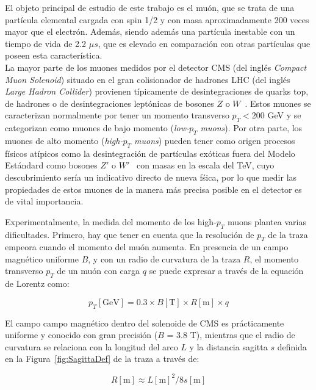
El objeto principal de estudio de este trabajo es el mu\'on, que se trata de una part\'icula elemental cargada con spin 1/2 y con masa aproximadamente 200 veces mayor que el electr\'on. Adem\'as, siendo adem\'as una part\'icula inestable con un tiempo de vida de 2.2 $\mu s$, que es elevado en comparaci\'on con otras part\'iculas que poseen esta caracter\'istica. \\

La mayor parte de los muones medidos por el detector CMS (del ingl\'es \textit{Compact Muon Solenoid}) situado en el gran colisionador de hadrones LHC (del ingl\'es \textit{Large Hadron Collider}) provienen t\'ipicamente de desintegraciones de quarks top, de hadrones o de desintegraciones lept\'onicas de bosones $Z$ o $W$~\cite{PhysRevD.98.030001}. Estos muones se caracterizan normalmente por tener un momento transverso $p_{T} < 200$ GeV y se categorizan como muones de bajo momento (\textit{low-$p_{T}$ muons}). Por otra parte, los muones de alto momento (\textit{high-$p_{T}$ muons}) pueden tener como origen procesos f\'isicos at\'ipicos como la desintegraci\'on de part\'iculas ex\'oticas fuera del Modelo Est\'andard como bosones $Z'$ o $W'$~\cite{CMS-PAS-EXO-19-019,2017278} con masas en la escala del TeV, cuyo descubrimiento ser\'ia un indicativo directo de nueva f\'sica, por lo que medir las propiedades de estos muones de la manera m\'as precisa posible en el detector es de vital importancia.

Experimentalmente, la medida del momento de los high-$p_{T}$ muons plantea varias dificultades. Primero, hay que tener en cuenta que la resoluci\'on de $p_{T}$ de la traza empeora cuando el momento del mu\'on aumenta.
En presencia de un campo magn\'etico uniforme $B$, y con un radio de curvatura de la traza $R$, el momento transverso $p_{T}$ de un mu\'on con carga $q$ se puede expresar a trav\'es de la equaci\'on de Lorentz como:

\begin{equation}
  p_{T}[\text{GeV}] = 0.3 \times B[\text{T}] \times R[\text{m}] \times q
\label{eq:pTvsRadius}
\end{equation}

El campo campo magn\'etico dentro del solenoide de CMS es pr\'acticamente uniforme y conocido con gran precisi\'on ($B$ = 3.8 T), mientras que el radio de curvatura se relaciona con la longitud del arco $L$ y la distancia sagitta $s$ definida en la Figura~\ref{fig:SagittaDef} de la traza a trav\'es de:

\begin{equation}
  R[\text{m}]\approx L[\text{m}]^{2}/8s[\text{m}]
\label{eq:RadiusvsSagitta}
\end{equation}


